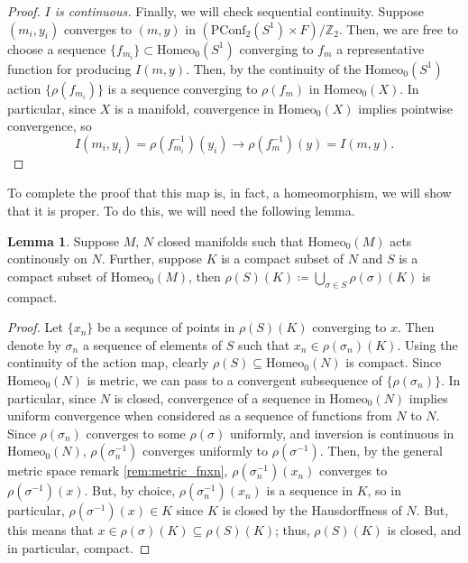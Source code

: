 \documentclass[10pt, oneside]{article}
\newcommand{\Z}{\mathbb{Z}}
\newcommand{\homeoS}{\text{Homeo}_0(S^1)}
\newcommand{\pconf}[1]{\text{PConf}_{#1}(S^1)}
\theoremstyle{definition}
\newtheorem{lem}{Lemma}[section]
\theoremstyle{definition}
\begin{document}
\begin{proof}
   {\it $I$ is continuous.} Finally, we will check sequential continuity. Suppose $(m_i, y_i)$ converges to $(m, y)$ in $(\pconf{2}\times F)/\Z_2$. Then, we are free to choose a sequence $\{f_{m_i}\} \subset \homeoS$ converging to $f_m$ a representative function for producing $I(m, y)$. Then, by the continuity of the $\homeoS$ action $\{\rho(f_{m_i})\}$ is a sequence converging to $\rho(f_m)$ in $\text{Homeo}_0(X)$. In particular, since $X$ is a manifold, convergence in $\text{Homeo}_0(X)$ implies pointwise convergence, so $$I(m_i, y_i) = \rho(f_{m_i}^{-1})(y_i) \to \rho(f_{m}^{-1})(y) = I(m, y).$$
\end{proof}

To complete the proof that this map is, in fact, a homeomorphism, we will show that it is proper. To do this, we will need the following lemma.

\begin{lem}\label{lem:cpct_subset_union}
    Suppose $M, \,N$ closed manifolds such that $\text{Homeo}_0(M)$ acts continously on $N$. Further, suppose $K$ is a compact subset of $N$ and $S$ is a compact subset of $\text{Homeo}_0(M)$, then $\rho(S)(K) \coloneqq \bigcup_{\sigma\in S} \rho(\sigma)(K)$ is compact.
\end{lem}

\begin{proof}
    Let $\{x_n\}$ be a sequnce of points in $\rho(S)(K)$ converging to $x$. Then denote by $\sigma_n$ a sequence of elements of $S$ such that $x_n\in\rho(\sigma_n)(K)$. Using the continuity of the action map, clearly $\rho(S)\subseteq\text{Homeo}_0(N)$ is compact. Since $\text{Homeo}_0(N)$ is metric, we can pass to a convergent subsequence of $\{\rho(\sigma_n)\}$. In particular, since $N$ is closed, convergence of a sequence in $\text{Homeo}_0(N)$ implies uniform convergence when considered as a sequence of functions from $N$ to $N$. Since $\rho(\sigma_n)$ converges to some $\rho(\sigma)$ uniformly, and inversion is continuous in $\text{Homeo}_0(N)$, $\rho(\sigma_n^{-1})$ converges uniformly to $\rho(\sigma^{-1})$. Then, by the general metric space remark \ref{rem:metric_fnxn}, $\rho(\sigma_n^{-1})(x_n)$ converges to $\rho(\sigma^{-1})(x)$. But, by choice, $\rho(\sigma_n^{-1})(x_n)$ is a sequence in $K$, so in particular, $\rho(\sigma^{-1})(x)\in K$ since $K$ is closed by the Hausdorffness of $N$. But, this means that $x\in\rho(\sigma)(K)\subseteq\rho(S)(K)$; thus, $\rho(S)(K)$ is closed, and in particular, compact.
\end{proof}
\end{document}
